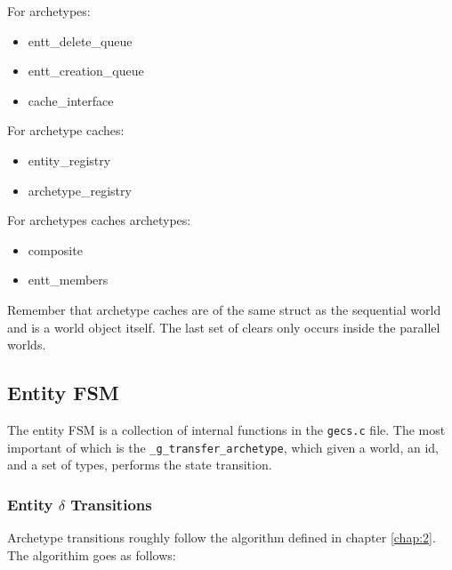 For archetypes:
\begin{itemize}
    \item entt\_delete\_queue
    \item entt\_creation\_queue
    \item cache\_interface
\end{itemize}

For archetype caches:
\begin{itemize}
    \item entity\_registry
    \item archetype\_registry
\end{itemize}

For archetypes caches archetypes:
\begin{itemize}
    \item composite
    \item entt\_members
\end{itemize}

Remember that archetype caches are of the same struct as the sequential world and is a world object itself. The last set of clears only occurs inside the parallel worlds.

\subsection{Entity FSM}
The entity FSM is a collection of internal functions in the \texttt{gecs.c} file. The most important of which is the \texttt{\_g\_transfer\_archetype}, which given a world, an id, and a set of types, performs the state transition.

\subsubsection{Entity $\delta$ Transitions}
Archetype transitions roughly follow the algorithm defined in chapter \ref{chap:2}. The algorithim goes as follows:

